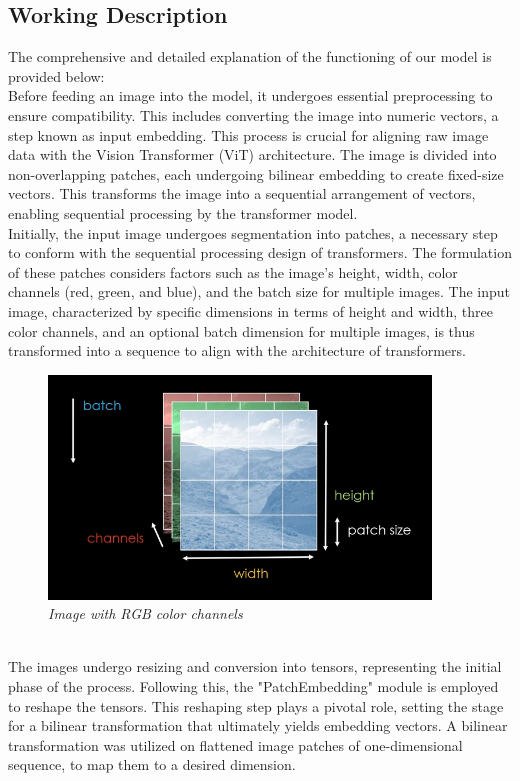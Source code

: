 \subsection{Working Description}

The comprehensive and detailed explanation of the functioning of our model is provided below:\\

Before feeding an image into the model, it undergoes essential preprocessing to ensure compatibility. This includes converting the image into numeric vectors, a step known as input embedding. This process is crucial for aligning raw image data with the Vision Transformer (ViT) architecture. The image is divided into non-overlapping patches, each undergoing bilinear embedding to create fixed-size vectors. This transforms the image into a sequential arrangement of vectors, enabling sequential processing by the transformer model.\\

Initially, the input image undergoes segmentation into patches, a necessary step to conform with the sequential processing design of transformers. The formulation of these patches considers factors such as the image's height, width, color channels (red, green, and blue), and the batch size for multiple images. The input image, characterized by specific dimensions in terms of height and width, three color channels, and an optional batch dimension for multiple images, is thus transformed into a sequence to align with the architecture of transformers.\\
\begin{figure}[htbp]
    \centering
    \includegraphics[width=4in]{img/colorbatch.png}
    \caption{\textit{Image with RGB color channels}}
\end{figure}\\
The images undergo resizing and conversion into tensors, representing the initial phase of the process. Following this, the "PatchEmbedding" module is employed to reshape the tensors. This reshaping step plays a pivotal role, setting the stage for a bilinear transformation that ultimately yields embedding vectors. A bilinear transformation was utilized on flattened image patches of one-dimensional sequence, to map them to a desired dimension.\\

